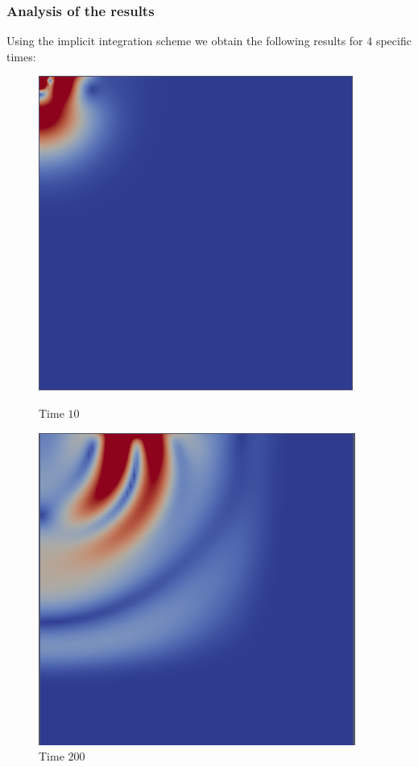 \subsubsection{Analysis of the results}
Using the implicit integration scheme we obtain the following results for $4$ specific times:
\begin{figure}[H]
\centering
\begin{minipage}{.5\textwidth}
  \centering
  \includegraphics[width=1.\linewidth]{images/Lamb1.png}
  \caption{Time $10$}
  \label{fig:Lamb1}
\end{minipage}%
\begin{minipage}{.5\textwidth}
  \centering
  \includegraphics[width=1.\linewidth]{images/Lamb3.png}
  \caption{Time $200$}
  \label{fig:Lamb2}
\end{minipage}
\end{figure} 

